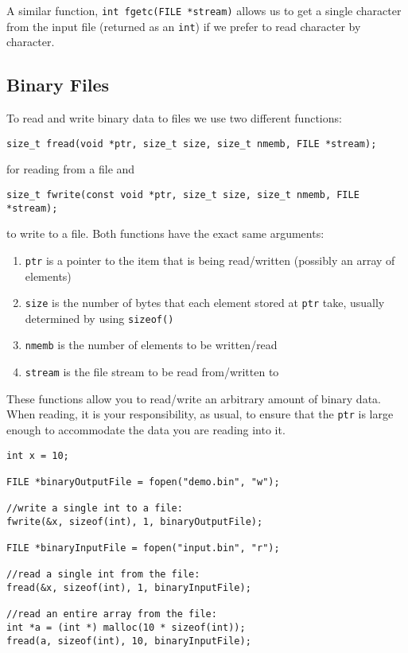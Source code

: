 A similar function, \texttt{int fgetc(FILE *stream)}
allows us to get a single character from the input file 
(returned as an \texttt{int}) if we prefer to read
character by character.

\subsection{Binary Files}

To read and write binary data to files we use two different
functions:

\texttt{size_t fread(void *ptr, size_t size, size_t nmemb, FILE *stream);} 

for reading from a file and 

\texttt{size_t fwrite(const void *ptr, size_t size, size_t nmemb, FILE *stream);}

to write to a file.  Both functions have the exact same arguments:
\begin{enumerate}
  \item \texttt{ptr} is a pointer to the item that 
  	is being read/written (possibly an array of elements)
  \item \texttt{size} is the number of bytes that each 
	element stored at \texttt{ptr} take, usually determined
	by using \texttt{sizeof()}
  \item \texttt{nmemb} is the number of elements to be 
  	written/read
  \item \texttt{stream} is the file stream to be read 
	from/written to
\end{enumerate}

These functions allow you to read/write an arbitrary amount of binary
data.  When reading, it is your responsibility, as usual, to 
ensure that the \texttt{ptr} is large enough to accommodate
the data you are reading into it.

\begin{verbatim}
int x = 10;

FILE *binaryOutputFile = fopen("demo.bin", "w");

//write a single int to a file:
fwrite(&x, sizeof(int), 1, binaryOutputFile);

FILE *binaryInputFile = fopen("input.bin", "r");

//read a single int from the file:
fread(&x, sizeof(int), 1, binaryInputFile);

//read an entire array from the file:
int *a = (int *) malloc(10 * sizeof(int));
fread(a, sizeof(int), 10, binaryInputFile);
\end{verbatim}

